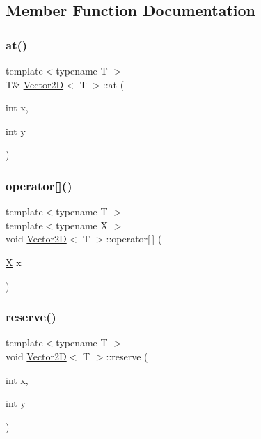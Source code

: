 \subsection{Member Function Documentation}
\mbox{\label{struct_vector2_d_a3394ac993a4bb0ee570fc4ed2f6357e3}} 
\subsubsection{\texorpdfstring{at()}{at()}}
{\footnotesize\ttfamily template$<$typename T $>$ \\
T\& \hyperlink{struct_vector2_d}{Vector2D}$<$ T $>$\+::at (\begin{DoxyParamCaption}\item[{int}]{x,  }\item[{int}]{y }\end{DoxyParamCaption})\hspace{0.3cm}{\ttfamily [inline]}}

\mbox{\label{struct_vector2_d_a73716695119afd405ffea6afd42391c0}} 
\subsubsection{\texorpdfstring{operator[]()}{operator[]()}}
{\footnotesize\ttfamily template$<$typename T $>$ \\
template$<$typename X $>$ \\
void \hyperlink{struct_vector2_d}{Vector2D}$<$ T $>$\+::operator\mbox{[}$\,$\mbox{]} (\begin{DoxyParamCaption}\item[{\hyperlink{_ops_8h_a588e6b56097e045c733b60d25c4d45aba02129bb861061d1a052c592e2dc6b383}{X}}]{x }\end{DoxyParamCaption})\hspace{0.3cm}{\ttfamily [inline]}}

\mbox{\label{struct_vector2_d_af891f05ae5cdfbe8d5c8f436ae04dc98}} 
\subsubsection{\texorpdfstring{reserve()}{reserve()}}
{\footnotesize\ttfamily template$<$typename T $>$ \\
void \hyperlink{struct_vector2_d}{Vector2D}$<$ T $>$\+::reserve (\begin{DoxyParamCaption}\item[{int}]{x,  }\item[{int}]{y }\end{DoxyParamCaption})\hspace{0.3cm}{\ttfamily [inline]}}

